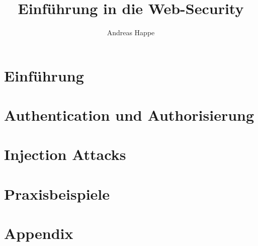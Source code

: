 \documentclass[letterpaper]{kdp}
\title{Einführung in die Web-Security}
\author{Andreas Happe}
\begin{document}

\tableofcontents %

\cleardoublepage %



\mainmatter

\part{Einführung}











\part{Authentication und Authorisierung}









\part{Injection Attacks}







\appendix

\part {Praxisbeispiele}



\part{Appendix}





\end{document}
